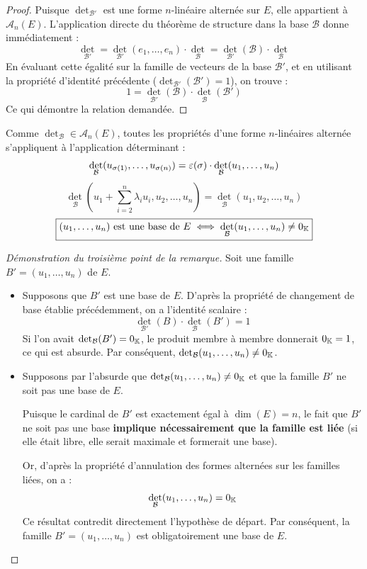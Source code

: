\documentclass[12pt, a4paper]{report}
\begin{document}
\begin{proof}
    Puisque $\det_{\mathcal{B}'}$ est une forme $n$-linéaire alternée sur $E$, elle appartient à $\mathscr A_n(E)$. L'application directe du théorème de structure dans la base $\mathcal{B}$ donne immédiatement :
    $$\det_{\mathcal{B}'} = \det_{\mathcal{B}'}(e_1, \dots, e_n) \cdot \det_{\mathcal{B}} = \det_{\mathcal{B}'}(\mathcal B) \cdot \det_{\mathcal{B}}$$
    En évaluant cette égalité sur la famille de vecteurs de la base $\mathcal{B}'$, et en utilisant la propriété d'identité précédente ($\det_{\mathcal{B}'}(\mathcal B') = 1$), on trouve :
    $$1 = \det_{\mathcal{B}'}(\mathcal B) \cdot \det_{\mathcal{B}}(\mathcal{B}')$$
    Ce qui démontre la relation demandée.
\end{proof}

\begin{remark}
    Comme $\det_\mathcal{B} \in \mathscr A_n(E)$, toutes les propriétés d'une forme $n$-linéaires alternée s'appliquent à l'application déterminant :
    $$\det_{\mathcal{B}}(u_{\sigma(1)}, \dots, u_{\sigma(n)}) = \varepsilon(\sigma) \cdot \det_{\mathcal{B}}(u_1, \dots, u_n)$$
    $$\det_{\mathcal{B}}\left(u_1 + \sum_{i=2}^{n}\lambda_i u_i, u_2, \dots, u_n\right) = \det_{\mathcal{B}}(u_1, u_2, \dots, u_n)$$
    $$\boxed{(u_1, \dots, u_n) \text{ est une base de } E \iff \det_{\mathcal{B}}(u_1, \dots, u_n) \ne 0_{\mathbb{K}}}$$
\end{remark}

\begin{proof}[Démonstration du troisième point de la remarque]
    Soit une famille $B' = (u_1, \dots, u_n)$ de $E$.
    \begin{itemize}
        \item[$\implies$] Supposons que $B'$ est une base de $E$. D'après la propriété de changement de base établie précédemment, on a l'identité scalaire :
        $$\det_{\mathcal{B}'}(B) \cdot \det_{\mathcal{B}}(B') = 1$$
        Si l'on avait $\det_{\mathcal{B}}(B') = 0_{\mathbb{K}}$, le produit membre à membre donnerait $0_{\mathbb{K}} = 1$, ce qui est absurde. Par conséquent, $\det_{\mathcal{B}}(u_1, \dots, u_n) \ne 0_{\mathbb{K}}$.
        
        \item[$\impliedby$] Supposons par l'absurde que $\det_{\mathcal{B}}(u_1, \dots, u_n) \ne 0_{\mathbb{K}}$ et que la famille $B'$ ne soit pas une base de $E$.
        
        Puisque le cardinal de $B'$ est exactement égal à $\dim(E) = n$, le fait que $B'$ ne soit pas une base \textbf{implique nécessairement que la famille est liée} (si elle était libre, elle serait maximale et formerait une base).
        
        Or, d'après la propriété d'annulation des formes alternées sur les familles liées, on a :
        $$\det_{\mathcal{B}}(u_1, \dots, u_n) = 0_{\mathbb{K}}$$
        Ce résultat contredit directement l'hypothèse de départ. Par conséquent, la famille $B' = (u_1, \dots, u_n)$ est obligatoirement une base de $E$.
    \end{itemize}
\end{proof}
\end{document}
